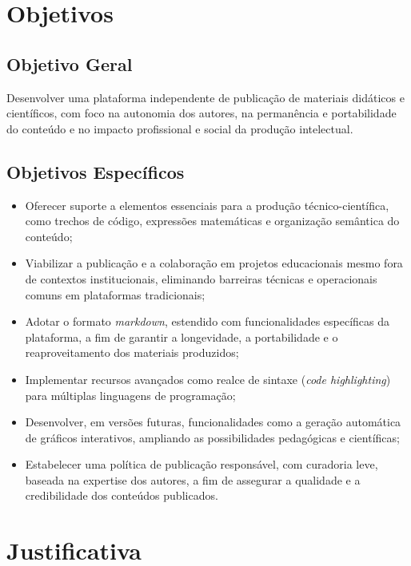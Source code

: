 \section{Objetivos}

\subsection{Objetivo Geral}

Desenvolver uma plataforma independente de publicação de materiais didáticos e científicos, com foco na autonomia dos autores, na permanência e portabilidade do conteúdo e no impacto profissional e social da produção intelectual.

\subsection{Objetivos Específicos}

\begin{itemize}
    \item Oferecer suporte a elementos essenciais para a produção técnico-científica, como trechos de código, expressões matemáticas e organização semântica do conteúdo;
    \item Viabilizar a publicação e a colaboração em projetos educacionais mesmo fora de contextos institucionais, eliminando barreiras técnicas e operacionais comuns em plataformas tradicionais;
    \item Adotar o formato \textit{markdown}, estendido com funcionalidades específicas da plataforma, a fim de garantir a longevidade, a portabilidade e o reaproveitamento dos materiais produzidos;
    \item Implementar recursos avançados como realce de sintaxe (\textit{code highlighting}) para múltiplas linguagens de programação;
    \item Desenvolver, em versões futuras, funcionalidades como a geração automática de gráficos interativos, ampliando as possibilidades pedagógicas e científicas;
    \item Estabelecer uma política de publicação responsável, com curadoria leve, baseada na expertise dos autores, a fim de assegurar a qualidade e a credibilidade dos conteúdos publicados.
\end{itemize}

\section{Justificativa}

